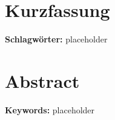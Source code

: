 \section*{Kurzfassung}
\textbf{Schlagwörter:} placeholder
%
\section*{Abstract}

\textbf{Keywords:} placeholder